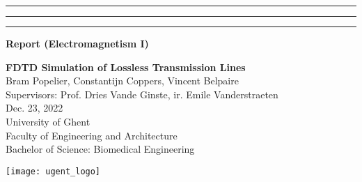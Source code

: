 {\color{ugent_blue} \hrule\hrule\hrule}

\vspace*{-0.43mm}
\colorbox{ugent_blue}{\color{white} \bf Report (Electromagnetism I)}\\

\noindent\begin{minipage}{0.7\textwidth}%
{\LARGE \bf \color{ugent_blue} FDTD Simulation of Lossless Transmission Lines}\\[2mm]

%
{\large Bram Popelier, Constantijn Coppers, Vincent Belpaire}\\
{Supervisors: Prof. Dries Vande Ginste, ir. Emile Vanderstraeten}\\
Dec. 23, 2022\\


{\small University of Ghent}\\
{\small Faculty of Engineering and Architecture}\\
{\small Bachelor of Science: Biomedical Engineering}\\
\end{minipage}%
\hfill%
\begin{minipage}{0.3\textwidth}
\vspace{-2.2cm}
\begin{center}
\texttt{[image: ugent\_logo]}
\end{center}
\end{minipage}\\